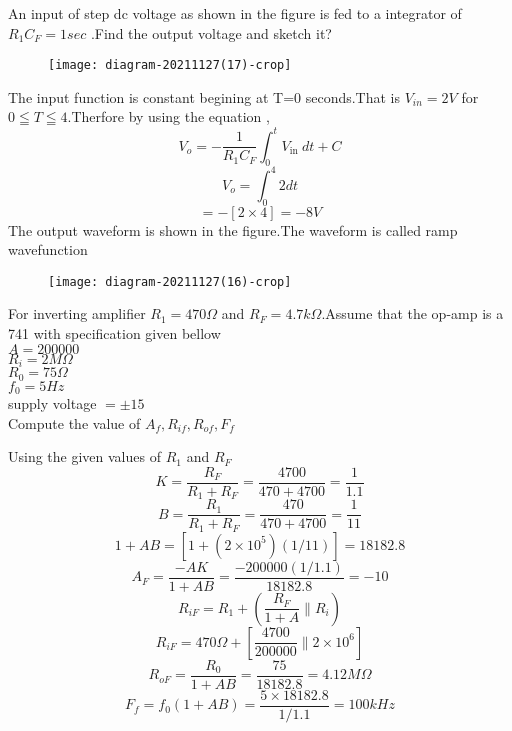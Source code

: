 \begin{enumerate}
	\begin{minipage}{\textwidth}
		\item An input of step dc voltage as shown in the figure is fed to a integrator of $R_1C_F=1 sec$ .Find the output voltage and sketch it?
		\begin{figure}[H]
			\centering
			\texttt{[image: diagram-20211127(17)-crop]}
		\end{figure}
	\end{minipage}
	\begin{answer}
		The input function is constant begining at T=0 seconds.That is $V_{in}=2V$ for $0\leqq T \leqq4$.Therfore by using the equation ,
		$$
		V_{o}=-\frac{1}{R_{1} C_{F}} \int_{0}^{t} V_{\text {in }} d t+C
		$$
		$$V_o=\int_{0}^{4}2 dt$$
		$$=-\left[ 2\times 4\right] =-8V$$
		The output waveform is shown in the figure.The waveform is called ramp wavefunction
		\begin{figure}[H]
			\centering
			\texttt{[image: diagram-20211127(16)-crop]}
		\end{figure}	
	\end{answer}
	\begin{minipage}{\textwidth}
		\item For inverting amplifier $R_1=470\Omega$ and $R_F=4.7k\Omega$.Assume that the op-amp is a 741 with specification given bellow\\
		$A=200000$\\
		$R_i=2M\Omega$\\
		$R_0=75\Omega$\\
		$f_0=5Hz$\\
		supply voltage $=\pm15$\\
		Compute the value of $A_f,R_{if},R_{of},F_f$
	\end{minipage}
	\begin{answer}
		Using the given values of $R_1$ and $R_F$\\
		$$K=\frac{R_F}{R_1+R_F}=\frac{4700}{470+4700}=\frac{1}{1.1}$$
		$$B=\frac{R_1}{R_1+R_F}=\frac{470}{470+4700}=\frac{1}{11}$$
		$$1+AB=\left[ 1+(2\times 10^5)(1/11)\right]=18182.8$$
		$$A_F=\frac{-AK}{1+AB}=\frac{-200000(1/1.1)}{18182.8}=-10$$
		$$R_{iF}=R_1+\left( \frac{R_F}{1+A}\parallel R_i\right) $$
		$$R_{iF}=470\Omega+\left[ \frac{4700}{200000}\parallel 2\times 10^6\right] $$
		$$R_{oF}=\frac{R_0}{1+AB}=\frac{75}{18182.8}=4.12M\Omega$$
		$$F_f=f_0(1+AB)=\frac{5 \times 18182.8}{1/1.1}=100kHz$$
	\end{answer}
\end{enumerate}